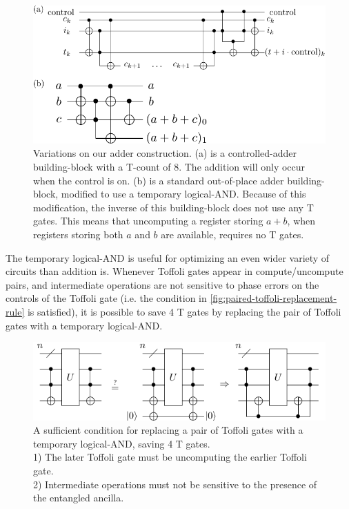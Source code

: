 \documentclass[twocolumn]{quantumarticle-customized}
\begin{document}
\begin{figure}
  \includegraphics[width=\linewidth]{other-adder-building-blocks.pdf}
  \caption{
	Variations on our adder construction.
	(a) is a controlled-adder building-block with a T-count of 8.
	The addition will only occur when the control is on.
	(b) is a standard out-of-place adder building-block, modified to use a temporary logical-AND.
	Because of this modification, the inverse of this building-block does not use any T gates.
	This means that uncomputing a register storing $a+b$, when registers storing both $a$ and $b$ are available, requires no T gates.
  }
  \label{fig:other-adder-building-blocks}
\end{figure}

The temporary logical-AND is useful for optimizing an even wider variety of circuits than addition is.
Whenever Toffoli gates appear in compute/uncompute pairs, and intermediate operations are not sensitive to phase errors on the controls of the Toffoli gate (i.e. the condition in \autoref{fig:paired-toffoli-replacement-rule} is satisfied), it is possible to save 4 T gates by replacing the pair of Toffoli gates with a temporary logical-AND.

\begin{figure}
  \includegraphics[width=\linewidth]{paired-toffoli-replacement-rule.pdf}
  \caption{
	A sufficient condition for replacing a pair of Toffoli gates with a temporary logical-AND, saving 4 T gates.\\
	1) The later Toffoli gate must be uncomputing the earlier Toffoli gate.\\
	2) Intermediate operations must not be sensitive to the presence of the entangled ancilla.
  }
  \label{fig:paired-toffoli-replacement-rule}
\end{figure}
\end{document}
